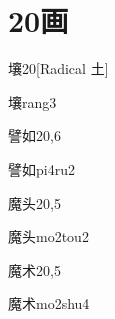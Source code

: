
\section*{20画}

\begin{entry}{壤}{20}[Radical 土]
  \begin{phonetics}{壤}{rang3}
  \end{phonetics}
\end{entry}

\begin{entry}{譬如}{20,6}
  \begin{phonetics}{譬如}{pi4ru2}
  \end{phonetics}
\end{entry}

\begin{entry}{魔头}{20,5}
  \begin{phonetics}{魔头}{mo2tou2}
  \end{phonetics}
\end{entry}

\begin{entry}{魔术}{20,5}
  \begin{phonetics}{魔术}{mo2shu4}
  \end{phonetics}
\end{entry}


